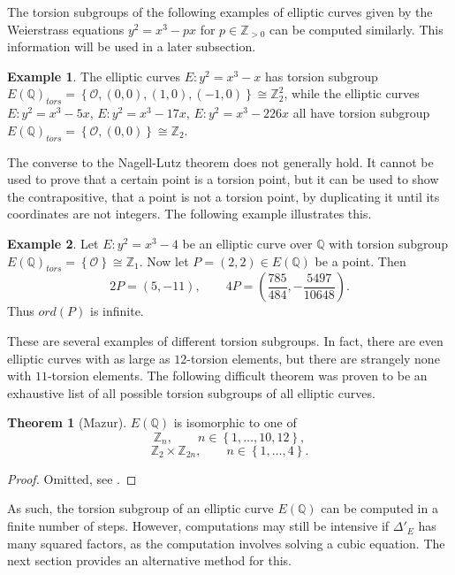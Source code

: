 \documentclass{article}
\newcommand{\Z}{\mathbb{Z}}
\newcommand{\Q}{\mathbb{Q}}
\newcommand{\rb}[1]{\left( #1 \right)}
\newcommand{\cb}[1]{\left\{ #1 \right\}}
\theoremstyle{definition}
\newtheorem*{example}{Example}
\newtheorem{theorem}[proposition]{Theorem}
\begin{document}
The torsion subgroups of the following examples of elliptic curves given by the Weierstrass equations $ y^2 = x^3 - px $ for $ p \in \Z_{> 0} $ can be computed similarly. This information will be used in a later subsection.

\begin{example}
The elliptic curves $ E : y^2 = x^3 - x $ has torsion subgroup $ E\rb{\Q}_{tors} = \cb{\mathcal{O}, \rb{0, 0}, \rb{1, 0}, \rb{-1, 0}} \cong \Z_2^2 $, while the elliptic curves $ E : y^2 = x^3 - 5x $, $ E : y^2 = x^3 - 17x $, $ E : y^2 = x^3 - 226x $ all have torsion subgroup $ E\rb{\Q}_{tors} = \cb{\mathcal{O}, \rb{0, 0}} \cong \Z_2 $.
\end{example}

The converse to the Nagell-Lutz theorem does not generally hold. It cannot be used to prove that a certain point is a torsion point, but it can be used to show the contrapositive, that a point is not a torsion point, by duplicating it until its coordinates are not integers. The following example illustrates this.

\begin{example}
Let $ E : y^2 = x^3 - 4 $ be an elliptic curve over $ \Q $ with torsion subgroup $ E\rb{\Q}_{tors} = \cb{\mathcal{O}} \cong \Z_1 $. Now let $ P = \rb{2, 2} \in E\rb{\Q} $ be a point. Then
$$ 2P = \rb{5, -11}, \qquad 4P = \rb{\dfrac{785}{484}, -\dfrac{5497}{10648}}. $$
Thus $ ord\rb{P} $ is infinite.
\end{example}

These are several examples of different torsion subgroups. In fact, there are even elliptic curves with as large as $ 12 $-torsion elements, but there are strangely none with $ 11 $-torsion elements. The following difficult theorem was proven to be an exhaustive list of all possible torsion subgroups of all elliptic curves.

\begin{theorem}[Mazur]
$ E\rb{\Q} $ is isomorphic to one of
$$ \Z_n, \qquad n \in \cb{1, \dots, 10, 12}, $$
$$ \Z_2 \times \Z_{2n}, \qquad n \in \cb{1, \dots, 4}. $$
\end{theorem}

\begin{proof}
Omitted, see \cite{mazur}.
\end{proof}

As such, the torsion subgroup of an elliptic curve $ E\rb{\Q} $ can be computed in a finite number of steps. However, computations may still be intensive if $ \Delta'_E $ has many squared factors, as the computation involves solving a cubic equation. The next section provides an alternative method for this.
\end{document}
